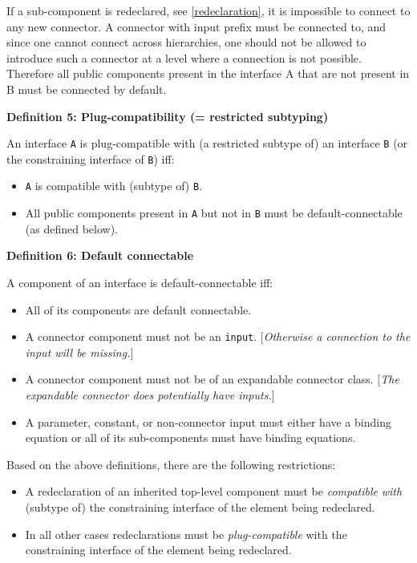 \begin{nonnormative}
If a sub-component is redeclared, see \autoref{redeclaration}, it is
impossible to connect to any new connector. A connector with input
prefix must be connected to, and since one cannot connect across
hierarchies, one should not be allowed to introduce such a connector at
a level where a connection is not possible. Therefore all public
components present in the interface A that are not present in B must be
connected by default.
\end{nonnormative}

\textbf{Definition 5: Plug-compatibility (= restricted subtyping)}

An interface \lstinline!A! is plug-compatible with (a restricted subtype of) an
interface \lstinline!B! (or the constraining interface of \lstinline!B!) iff:
\begin{itemize}
\item
  \lstinline!A! is compatible with (subtype of) \lstinline!B!.
\item
  All public components present in \lstinline!A! but not in \lstinline!B! must be
  default-connectable (as defined below).
\end{itemize}

\textbf{Definition 6: Default connectable}

A component of an interface is default-connectable iff:
\begin{itemize}
\item
  All of its components are default connectable.
\item
  A connector component must not be an \lstinline!input!. {[}\emph{Otherwise a
  connection to the input will be missing.}{]}
\item
  A connector component must not be of an expandable connector class.
  {[}\emph{The expandable connector does potentially have inputs.}{]}
\item
  A parameter, constant, or non-connector input must either have a
  binding equation or all of its sub-components must have binding
  equations.
\end{itemize}

Based on the above definitions, there are the following restrictions:
\begin{itemize}
\item
  A redeclaration of an inherited top-level component must be
  \emph{compatible} \emph{with} (subtype of) the constraining interface
  of the element being redeclared.
\item
  In all other cases redeclarations must be \emph{plug-compatible} with
  the constraining interface of the element being redeclared.
\end{itemize}

